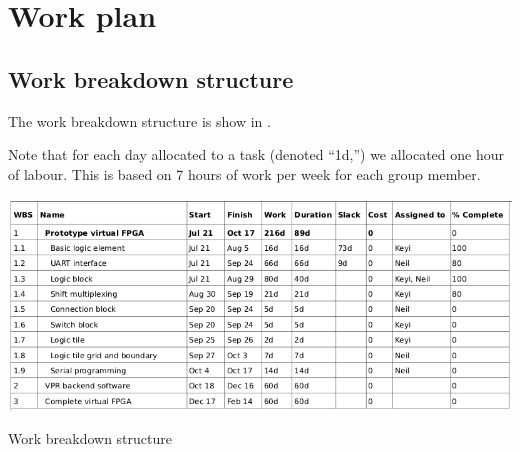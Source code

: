 \section{Work plan}

\subsection{Work breakdown structure} %
\label{wbs}

The work breakdown structure is show in .

Note that for each day allocated to a task (denoted ``1d,'') we allocated one hour of labour.
This is based on 7 hours of work per week for each group member.

\begin{table}[h!]
	\centering
	\includegraphics[scale=0.6]{wbs.png}
	\caption{Work breakdown structure}
	\label{work-breakdown}
\end{table}


